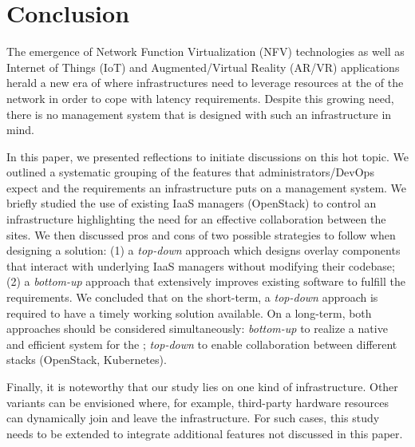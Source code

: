 \section{Conclusion}
\label{sec:conclusion}

The emergence of Network Function Virtualization (NFV) technologies as
well as Internet of Things (IoT) and Augmented/Virtual Reality (AR/VR)
applications herald a new era of \cloudcomputing where infrastructures
need to leverage resources at the \edge of the network in order to cope
with latency requirements.  Despite this growing need, there is no
\cloud management system that is designed with such an infrastructure
in mind.

In this paper, we presented reflections to initiate discussions on this
hot topic. 
We outlined a systematic grouping of the features that administrators/DevOps
expect and the requirements an \edge infrastructure puts on a \cloud management
system.
We briefly studied the use of existing IaaS managers (\ie OpenStack)
to control an \edge infrastructure highlighting the need for an
effective collaboration between the \edge sites.  
We then discussed pros and cons of two possible strategies to follow when
designing a solution: (1) a \emph{top-down} approach which designs overlay
components that interact with underlying IaaS managers without modifying their
codebase; (2) a \emph{bottom-up} approach that extensively
improves existing software to fulfill the requirements. We concluded
that on the short-term, a \emph{top-down} approach is required to have
a timely working solution available. On a long-term, both approaches should be
considered simultaneously: \emph{bottom-up} to realize a native and efficient
system for the \edge; \emph{top-down} to enable collaboration between different
\cloud stacks (\eg OpenStack, Kubernetes).

Finally, it is noteworthy that our study lies on one kind of \edge
infrastructure. Other variants can be envisioned where, for example, third-party
hardware resources can dynamically join
and leave the infrastructure. For such cases, this study needs to be
extended to integrate additional features not discussed in this paper.

